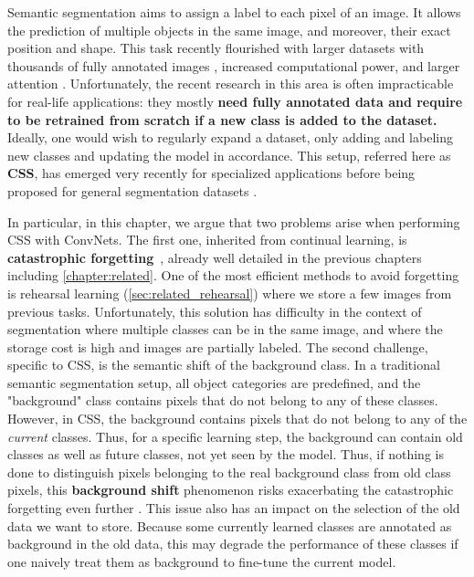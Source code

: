 Semantic segmentation aims to assign a label to each pixel of an image. It allows the prediction of
multiple objects in the same image, and moreover, their exact position and shape. This task recently
flourished \citep{tao2020HRNet,zhang2020resnest,chen2018ZPSA} with larger datasets with thousands of
fully annotated images \citep{zhou2017adedataset,neuhold2017mapillary}, increased computational
power, and larger attention \citep{wang2020axialdeeplab}. Unfortunately, the recent research in this
area is often impracticable for real-life applications: they mostly \textbf{need fully annotated
    data and require to be retrained from scratch if a new class is added to the dataset.} Ideally, one
would wish to regularly expand a dataset, only adding and labeling new classes and updating the
model in accordance. This setup, referred here as \textbf{\acf{CSS}}, has emerged very recently for
specialized applications
\citep{ozdemir2018learnthenewkeeptheold,ozdemir2019segmentationanotomical,tasar19incrementsegmentationremotesensing}
before being proposed for general segmentation datasets
\citep{michieli2019ilt,cermelli2020modelingthebackground}.


In particular, in this chapter, we argue that two problems arise when performing \ac{CSS} with
\acp{ConvNet}. The first one, inherited from continual learning, is \textbf{catastrophic
    forgetting}~\citep{robins1995catastrophicforgetting}, already well detailed in the previous chapters
including \autoref{chapter:related}. One of the most efficient methods to avoid forgetting is
rehearsal learning (\autoref{sec:related_rehearsal}) where we store a few images from previous
tasks. Unfortunately, this solution has difficulty in the context of segmentation where multiple
classes can be in the same image, and where the storage cost is high and images are partially
labeled. The second challenge, specific to \ac{CSS}, is the semantic shift of the background class.
In a traditional semantic segmentation setup, all object categories are predefined, and the
"background" class contains pixels that do not belong to any of these classes. However, in \ac{CSS},
the background contains pixels that do not belong to any of the \textit{current} classes. Thus, for
a specific learning step, the background can contain old classes as well as future classes, not yet
seen by the model. Thus, if nothing is done to distinguish pixels belonging to the real background
class from old class pixels, this \textbf{background shift} phenomenon risks exacerbating the
catastrophic forgetting even further \citep{cermelli2020modelingthebackground}. This issue also has
an impact on the selection of the old data we want to store. Because some currently learned classes
are annotated as background in the old data, this may degrade the performance of these classes if
one naively treat them as background to fine-tune the current model.

